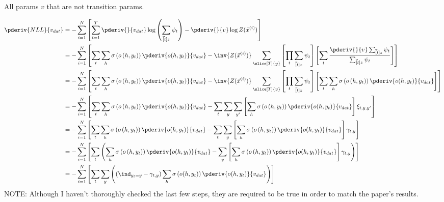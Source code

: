 \documentclass[11pt]{article}
\begin{document}
\begin{example} 
	
	All params $v$ that are not transition params. 
	
	\begin{align}
	\pderiv{NLL}{v_{dat}} 
	&=  - \sum_{i=1}^{N} \left[ \sum_{t = 1}^{T} \pderiv{}{v_{dat}} \log\left( \sum_{\vec[t]{z}} \psi_t \right) 
	- \pderiv{}{v} \log Z(\vec{x}^{(i)}) \right] \\
	&= - \sum_{i=1}^{N} \left[ \sum_t \sum_h \sigma\left(o\left(h, y_t\right)\right) \pderiv{o(h, y_t)}{v_{dat}}
	- \inv{Z(\vec{x}^{(i)})} \sum_{\slice[T]{y}}   
	\left[ \prod_t \sum_{\vec[t]{z}} \psi_t \right] \left[
	\sum_t \frac{\pderiv{}{v} \sum_{\vec[t]{z}}  \psi_t }{ \sum_{\vec[t]{z}} \psi_t   }
	\right]
	\right] \\ 
	&= - \sum_{i=1}^{N} \left[ \sum_t \sum_h \sigma\left(o\left(h, y_t\right)\right) \pderiv{o(h, y_t)}{v_{dat}}
	- \inv{Z(\vec{x}^{(i)})} \sum_{\slice[T]{y}}   
	\left[ \prod_t \sum_{\vec[t]{z}} \psi_t \right] \left[
	\sum_t \sum_h \sigma\left(o\left(h, y_t\right)\right) \pderiv{o(h, y_t)}{v_{dat}}
	\right]
	\right] \\
	&= - \sum_{i=1}^{N} \left[ \sum_t \sum_h \sigma\left(o\left(h, y_t\right)\right) \pderiv{o(h, y_t)}{v_{dat}}
	- \sum_t \sum_y \sum_{y'} \left[\sum_h \sigma\left(o\left(h, y_t\right)\right) \pderiv{o(h, y_t)}{v_{dat}} \right] \xi_{t,y,y'}
	\right] \\
	&= - \sum_{i=1}^{N} \left[ \sum_t \sum_h \sigma\left(o\left(h, y_t\right)\right) \pderiv{o(h, y_t)}{v_{dat}}
	- \sum_t \sum_y \left[\sum_h \sigma\left(o\left(h, y_t\right)\right) \pderiv{o(h, y_t)}{v_{dat}} \right] \gamma_{t,y}
	\right] \\
	&= - \sum_{i=1}^{N} \left[ \sum_t \left( \sum_h \sigma\left(o\left(h, y_t\right)\right) \pderiv{o(h, y_t)}{v_{dat}}
	- \sum_y \left[\sum_h \sigma\left(o\left(h, y_t\right)\right) \pderiv{o(h, y_t)}{v_{dat}} \right] \gamma_{t,y}
	\right) \right] \\
	&= - \sum_{i=1}^{N} \left[ \sum_t \sum_y \left(    \left(
	\ind_{y_t = y} -  \gamma_{t,y} \right) 
	\sum_h   \sigma\left(o(h, y_t)\right) \pderiv{o(h, y_t)}{v_{dat}} \right) \right] 
	\end{align}
	NOTE: Although I haven't thoroughly checked the last few steps, they are required to be true in order to match the paper's results.
\end{example}
\end{document}
